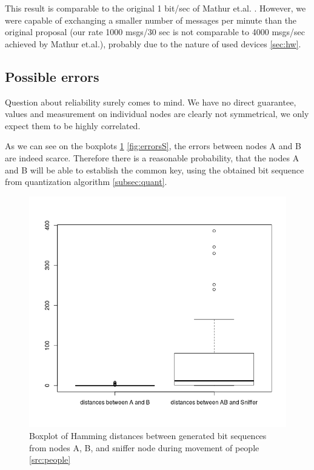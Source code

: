 \documentclass[
  print, %
  Table,   %
  nolof,     %
  nolot,     %
           oneside
]{fithesis3}
\begin{document}
  This result is comparable to the original 1 bit/sec of Mathur et.al. \cite{Mathur2008Rssi}. However, we were capable of exchanging a smaller number of messages per minute than the original proposal (our rate 1000 msgs/30 sec is not comparable to 4000 msgs/sec achieved by Mathur et.al.), probably due to the nature of used devices \ref{sec:hw}.


  \subsection{Possible errors}
  Question about reliability surely comes to mind. We have no direct guarantee, values and measurement on individual nodes are clearly not symmetrical, we only expect them to be highly correlated.

  As we can see on the boxplots \ref{fig:errorsT} \ref{fig:errorsS}, the errors between nodes A and B are indeed scarce. Therefore there is a reasonable probability, that the nodes A and B will be able to establish the common key, using the obtained bit sequence from quantization algorithm \ref{subsec:quant}.


  \begin{figure}
    \includegraphics[width=\textwidth]{../images/boxplotDistancesTeaching.png}
  \caption{Boxplot of Hamming distances between generated bit sequences from nodes A, B, and sniffer node during movement of people \ref{src:people}}
  \label{fig:errorsT}
  \end{figure}
\end{document}
